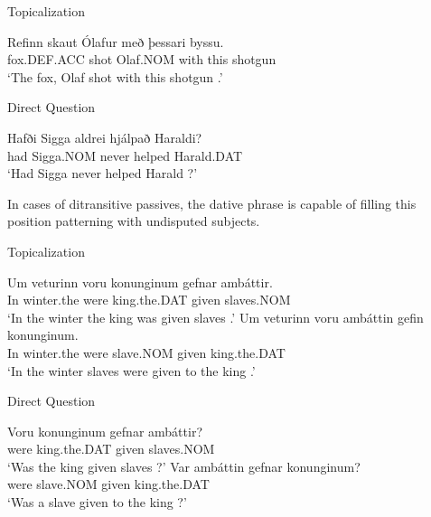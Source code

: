 \begin{exe}
\ex Topicalization
\begin{xlist}
\ex \gll Refinn skaut Ólafur með  þessari byssu.\\
fox.DEF.ACC shot Olaf.NOM with this shotgun\\
\trans `The fox, Olaf shot with this shotgun \citep[ex. 19a]{Zaenen.1985}.'
\end{xlist}
\ex Direct Question
\begin{xlist}
\ex \gll Hafði Sigga aldrei hjálpað Haraldi?\\
had Sigga.NOM never helped Harald.DAT\\
\trans `Had Sigga never helped Harald \citep[ex. 20b]{Zaenen.1985}?'
\end{xlist}
\end{exe}

In cases of ditransitive passives, the dative phrase is capable of filling this position patterning with undisputed subjects.

\begin{exe}
\ex Topicalization
\begin{xlist}
\ex \gll Um veturinn voru konunginum gefnar amb\'{a}ttir.\\
In winter.the were king.the.DAT given slaves.NOM\\
\trans `In the winter the king was given slaves \citep[ex. 47a]{Zaenen.1985}.'
\ex \gll Um veturinn voru amb\'{a}ttin gefin konunginum.\\
In winter.the were slave.NOM given king.the.DAT\\
\trans `In the winter slaves were given to the king \citep[ex. 47b]{Zaenen.1985}.'
\end{xlist}
\ex Direct Question
\begin{xlist}
\ex \gll Voru konunginum gefnar amb\'{a}ttir?\\
were king.the.DAT given slaves.NOM\\
\trans `Was the king given slaves \citep[ex. 48a]{Zaenen.1985}?'
\ex \gll Var amb\'{a}ttin gefnar konunginum?\\
were slave.NOM given king.the.DAT\\
\trans `Was a slave given to the king \citep[ex. 48b]{Zaenen.1985}?'
\end{xlist}
\end{exe}

